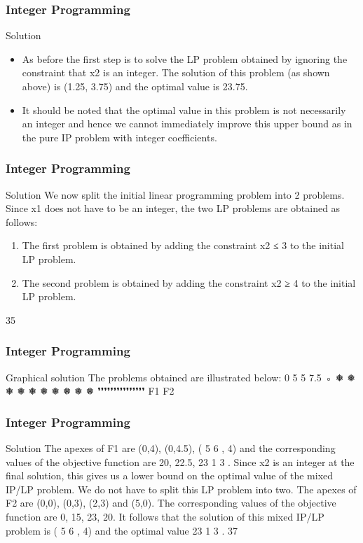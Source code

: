 \begin{frame} 
\frametitle{Integer Programming}     
Solution
\begin{itemize}
	\item As before the first step is to solve the LP problem obtained by
	ignoring the constraint that x2 is an integer. The solution of this
	problem (as shown above) is (1.25, 3.75) and the optimal value is
	23.75.
	\item It should be noted that the optimal value in this problem is not
	necessarily an integer and hence we cannot immediately improve
	this upper bound as in the pure IP problem with integer
	coefficients.
\end{itemize}

\end{frame}  
\begin{frame} 
\frametitle{Integer Programming}     
Solution
We now split the initial linear programming problem into 2
problems. Since x1 does not have to be an integer, the two LP
problems are obtained as follows:
\begin{enumerate}
	\item The first problem is obtained by adding the
	constraint x2 ≤ 3 to the initial LP problem.
	\item The second problem is obtained by adding the
	constraint x2 ≥ 4 to the initial LP problem.
\end{enumerate}

35 \end{frame}  \begin{frame} \frametitle{Integer Programming}     
Graphical solution
The problems obtained are illustrated below:
0
5
5 7.5
◦
❅
❅
❅
❅
❅
❅
❅
❅
❅
❅
❜❜❜❜❜❜❜❜❜❜❜❜❜❜❜
F1
F2
\end{frame}  
\begin{frame} 
\frametitle{Integer Programming}     
Solution
The apexes of F1 are (0,4), (0,4.5), ( 5
6
, 4) and the corresponding
values of the objective function are 20, 22.5, 23 1
3
.
Since x2 is an integer at the final solution, this gives us a lower
bound on the optimal value of the mixed IP/LP problem. We do
not have to split this LP problem into two.
The apexes of F2 are (0,0), (0,3), (2,3) and (5,0). The
corresponding values of the objective function are 0, 15, 23, 20. It
follows that the solution of this mixed IP/LP problem is ( 5
6
, 4) and
the optimal value 23 1
3
.
37 
\end{frame}  

